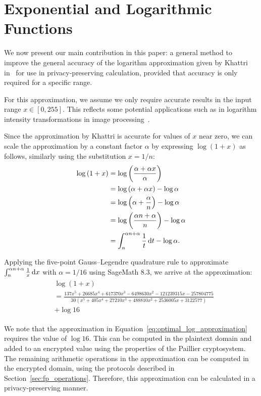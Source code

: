 \section{Exponential and Logarithmic Functions}
We now present our main contribution in this paper: a general method to improve the general accuracy of the logarithm approximation given by Khattri in~\cite{khattri_new_2009} for use in privacy-preserving calculation, provided that accuracy is only required for a specific range.

For this approximation, we assume we only require accurate results in the input range $x \in [0, 255]$. This reflects some potential applications such as in logarithm intensity transformations in image processing~\cite{gonzalez_digital_2008}.

Since the approximation by Khattri is accurate for values of $x$ near zero, we can scale the approximation by a constant factor $\alpha$ by expressing $\log(1+x)$ as follows, similarly using the substitution $x=1/n$:
\begin{align*}
	\log{(1+x)} &= \log{\left(\frac{\alpha + \alpha x}{\alpha}\right)}\\
	&= \log{(\alpha + \alpha x)} - \log{\alpha}\\
	&= \log{\left(\alpha+\frac{\alpha}{n}\right)} - \log{\alpha}\\
	&= \log{\left(\frac{\alpha n + \alpha}{n}\right)} - \log{\alpha}\\
	&= \int_{n}^{\alpha n + \alpha}{\frac{1}{t}\mathop{}\!\mathrm{d} t} - \log{\alpha}.
\end{align*}

Applying the five-point Gauss--Legendre quadrature rule to approximate $\int_{n}^{\alpha n + \alpha}{\frac{1}{x}\mathop{}\!\mathrm{d} x}$ with $\alpha = 1/16$ using SageMath 8.3, we arrive at the approximation:
\begin{align}\label{eq:optimal_log_approximation}
	\begin{split}
		&\log(1+x) \\
		&=\frac{137x^5 + 26685x^4 + 617370x^3 - 6498630x^2 - 121239315x - 257804775}
		{30(x^5 + 405x^4 + 27210x^3 + 488810x^2 + 2536005x + 3122577)}\\
		&+ \log{16}
	\end{split}
\end{align}

We note that the approximation in Equation~\ref{eq:optimal_log_approximation} requires the value of $\log{16}$. This can be computed in the plaintext domain and added to an encrypted value using the properties of the Paillier cryptosystem. The remaining arithmetic operations in the approximation can be computed in the encrypted domain, using the protocols described in Section~\ref{sec:fp_operations}. Therefore, this approximation can be calculated in a privacy-preserving manner.

